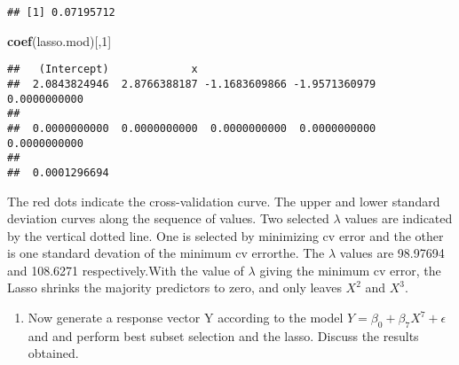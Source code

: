 \documentclass[]{article}
\newenvironment{Shaded}{\begin{snugshade}}{\end{snugshade}}
\newcommand{\KeywordTok}[1]{\textcolor[rgb]{0.13,0.29,0.53}{\textbf{{#1}}}}
\newcommand{\DecValTok}[1]{\textcolor[rgb]{0.00,0.00,0.81}{{#1}}}
\newcommand{\NormalTok}[1]{{#1}}
\providecommand{\tightlist}{%
  \setlength{\itemsep}{0pt}\setlength{\parskip}{0pt}}
\begin{document}
\begin{verbatim}
## [1] 0.07195712
\end{verbatim}

\begin{Shaded}
\begin{Highlighting}[]
\KeywordTok{coef}\NormalTok{(lasso.mod)[,}\DecValTok{1}\NormalTok{]}
\end{Highlighting}
\end{Shaded}

\begin{verbatim}
##   (Intercept)             x                                           
##  2.0843824946  2.8766388187 -1.1683609866 -1.9571360979  0.0000000000 
##                                                                       
##  0.0000000000  0.0000000000  0.0000000000  0.0000000000  0.0000000000 
##               
##  0.0001296694
\end{verbatim}

The red dots indicate the cross-validation curve. The upper and lower
standard deviation curves along the sequence of values. Two selected
\(\lambda\) values are indicated by the vertical dotted line. One is
selected by minimizing cv error and the other is one standard devation
of the minimum cv errorthe. The \(\lambda\) values are 98.97694 and
108.6271 respectively.With the value of \(\lambda\) giving the minimum
cv error, the Lasso shrinks the majority predictors to zero, and only
leaves \(X^2\) and \(X^3\).

\begin{enumerate}
\def\labelenumi{(\alph{enumi})}
\setcounter{enumi}{5}
\tightlist
\item
  Now generate a response vector Y according to the model
  \(Y=\beta_0 +\beta_7X^7+\epsilon\)and and perform best subset
  selection and the lasso. Discuss the results obtained.
\end{enumerate}
\end{document}

